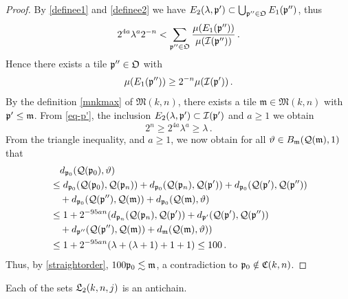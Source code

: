 \begin{proof}
    By \eqref{definee1} and \eqref{definee2} we have $E_2(\lambda, {\mathfrak p}') \subset \bigcup_{{\mathfrak p}'' \in \mathfrak{O}} E_1({\mathfrak p}'')$, thus
    $$
        2^{4a}\lambda^a 2^{-n} < \sum_{{\mathfrak p}'' \in \mathfrak{O}} \frac{\mu(E_1({\mathfrak p}''))}{\mu({\mathcal{I}}({\mathfrak p}''))}\,.
    $$
    Hence there exists a tile ${\mathfrak p}'' \in \mathfrak{O}$ with
    \begin{equation*}
        \mu(E_1({\mathfrak p}'')) \ge 2^{-n} \mu({\mathcal{I}}({\mathfrak p}'))\,.
    \end{equation*}
    By the definition \eqref{mnkmax} of $\mathfrak{M}(k,n)$, there exists a tile $\mathfrak{m} \in \mathfrak{M}(k,n)$ with ${\mathfrak p}' \leq \mathfrak{m}$. From \eqref{eq-p'}, the inclusion $E_2(\lambda, {\mathfrak p}') \subset {\mathcal{I}}({\mathfrak p}')$ and $a\ge 1$ we obtain
    $$
        2^n \geq 2^{4a} \lambda^{a} \geq \lambda\,.
    $$
    From the triangle inequality,  and $a \ge 1$, we now obtain for all ${\vartheta} \in B_{\mathfrak{m}}({\mathcal{Q}}(\mathfrak{m}), 1)$ that
    \begin{align*}
        &\quad d_{{\mathfrak p}_0}({\mathcal{Q}}({\mathfrak p}_0), {\vartheta})\\
        &\leq d_{{\mathfrak p}_0}({\mathcal{Q}}({\mathfrak p}_0), {\mathcal{Q}}({\mathfrak p}_{n})) + d_{{\mathfrak p}_0}({\mathcal{Q}}({\mathfrak p}_{n}), {\mathcal{Q}}({\mathfrak p}')) + d_{{\mathfrak p}_0}({\mathcal{Q}}({\mathfrak p}'), {\mathcal{Q}}({\mathfrak p}''))\\
        &\quad+ d_{{\mathfrak p}_0}({\mathcal{Q}}({\mathfrak p}''), {\mathcal{Q}}(\mathfrak{m})) +
        d_{{\mathfrak p}_0}({\mathcal{Q}}(\mathfrak{m}), {\vartheta})\\
        &\leq 1 + 2^{-95an} (d_{{\mathfrak p}_{n}}({\mathcal{Q}}({\mathfrak p}_n), {\mathcal{Q}}({\mathfrak p}')) + d_{{\mathfrak p}'}({\mathcal{Q}}({\mathfrak p}'), {\mathcal{Q}}({\mathfrak p}''))\\
        &\quad+ d_{{\mathfrak p}''}({\mathcal{Q}}({\mathfrak p}''), {\mathcal{Q}}(\mathfrak{m})) +
        d_{\mathfrak{m}}({\mathcal{Q}}(\mathfrak{m}), {\vartheta}))\\
        &\leq 1 + 2^{-95an}(\lambda + (\lambda + 1) + 1 + 1) \leq 100\,.
    \end{align*}
    Thus, by \eqref{straightorder}, $100{\mathfrak p}_0 \lesssim \mathfrak{m}$, a contradiction to ${\mathfrak p}_0 \notin {\mathfrak C}(k,n)$.
\end{proof}

\begin{lemma}[L2 antichain]
\label{L2-antichain}
\leanok
{}
    Each of the sets ${\mathfrak L}_2(k,n,j)$ is an antichain.
\end{lemma}

